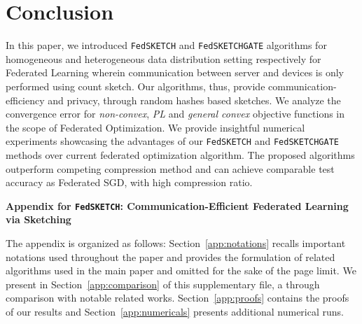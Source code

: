 \documentclass{article} %
\begin{document}
\vspace{-0.1in}
\section{Conclusion}
\vspace{-0.05in}

In this paper, we introduced \texttt{FedSKETCH} and \texttt{FedSKETCHGATE} algorithms for homogeneous and heterogeneous data distribution setting respectively for Federated Learning wherein communication between server and devices is only performed using count sketch. 
Our algorithms, thus, provide communication-efficiency and privacy, through random hashes based sketches. 
We analyze the convergence error for \emph{non-convex}, \emph{PL} and \emph{general convex} objective functions in the scope of Federated Optimization.  
We provide insightful numerical experiments showcasing the advantages of our \texttt{FedSKETCH} and \texttt{FedSKETCHGATE} methods over current federated optimization algorithm. The proposed algorithms outperform competing compression method and can achieve comparable test accuracy as Federated SGD, with high compression ratio.






\clearpage



\clearpage

\appendix
%





 {\Large\bfseries Appendix for \texttt{FedSKETCH}: Communication-Efficient Federated Learning
via Sketching \par}

\vspace{0.5in}

The appendix is organized as follows:
Section~\ref{app:notations} recalls important notations used throughout the paper and provides the formulation of related algorithms used in the main paper and omitted for the sake of the page limit.
We present in Section~\ref{app:comparison} of this supplementary file, a through comparison with notable related works.
Section~\ref{app:proofs} contains the proofs of our results and Section~\ref{app:numericals} presents additional numerical runs.
\end{document}
